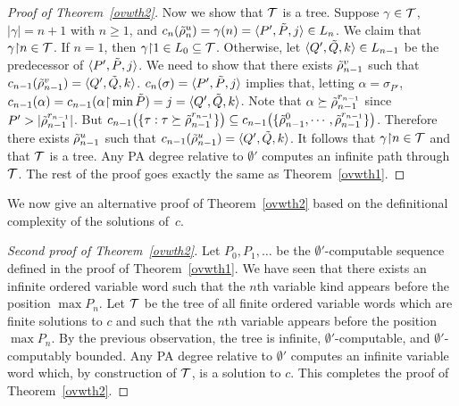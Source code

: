 \begin{proof}[Proof of Theorem~\ref{ovwth2}]
Now we show that $\mathcal{T}$ is a tree.
Suppose $\gamma\in \mathcal{T}$,
$|\gamma| = n+1$ with $n \geq 1$, and  $c_n(\tilde{\rho}_n^u)
 =\gamma(n) = \langle P',\tilde{P},j \rangle \in L_n$.
 We claim that $\gamma {\upharpoonright} n \in \mathcal{T}$.
 If $n = 1$, then $\gamma {\upharpoonright} 1 \in L_0 \subseteq \mathcal{T}$.
 Otherwise, let
$\langle Q',\tilde{Q},k \rangle \in L_{n-1}$ be the predecessor
  of $\langle P',\tilde{P},j \rangle$.
We need to show that
there exists $\tilde{\rho}_{n-1}^v$ such that
$c_{n-1}(\tilde{\rho}_{n-1}^v) = \langle Q',\tilde{Q},k \rangle$.
$c_n(\sigma) = \langle P',\tilde{P},j \rangle$ implies
that, letting $\alpha = \sigma_{P'}$,
$c_{n-1}(\alpha) = c_{n-1}(\alpha{\upharpoonright} \min \tilde{P})
 = j = \langle Q',\tilde{Q},k \rangle$.
Note that $\alpha\succeq \tilde{\rho}_{n-1}^{r_{n-1}}$
since $P'> |\tilde{\rho}_{n-1}^{r_{n-1}}|$.
But $c_{n-1}\big( \{\tau:\tau\succeq \tilde{\rho}_{n-1}^{r_{n-1}}\}\big)
\subseteq c_{n-1}\big(\{\tilde{\rho}_{n-1}^0,\cdots,\tilde{\rho}_{n-1}^{r_{n-1}}\} \big)$.
Therefore there exists $\tilde{\rho}_{n-1}^u$ such that
$c_{n-1}(\tilde{\rho}_{n-1}^u) = \langle Q',\tilde{Q},k \rangle$.
It follows that $\gamma {\upharpoonright} n \in \mathcal{T}$ and that $\mathcal{T}$ is a tree.
Any PA degree relative to $\emptyset'$ computes an infinite path through $\mathcal{T}$. The rest of the proof goes exactly the same
 as Theorem~\ref{ovwth1}.
\end{proof}

We now give an alternative proof of Theorem~\ref{ovwth2} based on the definitional complexity of the solutions of~$c$.

\begin{proof}[Second proof of Theorem~\ref{ovwth2}]
Let $P_0, P_1, \dots$ be the $\emptyset'$-computable sequence defined in the proof of Theorem~\ref{ovwth1}. We have seen that there exists an infinite ordered variable word such that the $n$th variable kind appears before the position $\max P_n$. Let $\mathcal{T}$ be the tree of all finite ordered variable words which are finite solutions to $c$ and such that the $n$th variable appears before the position $\max P_n$. By the previous observation, the tree is infinite, $\emptyset'$-computable, and $\emptyset'$-computably bounded. Any PA degree relative to $\emptyset'$ computes an infinite variable word which, by construction of $\mathcal{T}$, is a solution to $c$. This completes the proof of Theorem~\ref{ovwth2}.
\end{proof}

